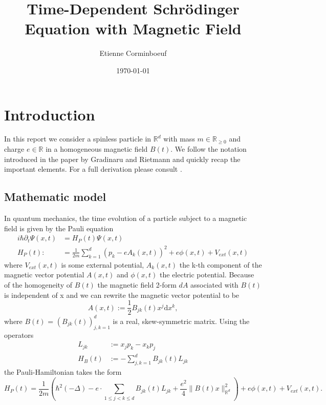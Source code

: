 \documentclass{article}
\title{Time-Dependent Schr{\"o}dinger Equation with Magnetic Field}
\author{Etienne Corminboeuf}
\date{\today}
\begin{document}
\maketitle

\tableofcontents

\section{Introduction} \label{sec:intro}
In this report we consider a spinless particle in $\mathbb{R}^d$ with mass $m \in \mathbb{R}_{\geq 0}$ and charge $e\in \mathbb{R}$ in a homogeneous magnetic field $B(t)$. We follow the notation introduced in the paper by Gradinaru and Rietmann and quickly recap the important elements. For a full derivation please consult \cite{paper_orvg}.
\subsection{Mathematic model}

In quantum mechanics, the time evolution of a particle subject to a magnetic field is given by the Pauli equation
\begin{align} \label{eq_pauli}
  i \hbar \partial_t \Psi(x,t) &= H_P(t)\Psi(x,t) \\
  H_P(t) :&= \frac{1}{2m} \sum_{k=1}^d (p_k - e A_k(x,t))^2 + e\phi(x,t) + V_{ext}(x,t)
\end{align}
where $V_{ext}(x,t)$ is some external potential, $A_k(x,t)$ the k-th component of the magnetic vector potential $A(x,t)$ and $\phi(x,t)$ the electric potential.
Because of the homogeneity of $B(t)$ the magnetic field 2-form $dA$ associated with $B(t)$ is independent of x and we can rewrite the magnetic vector potential to be
\begin{equation}
  A(x,t) := \frac{1}{2}B_{jk}(t)x^j \textrm{d}x^k,
\end{equation}
where $B(t)$ = $(B_{jk}(t))_{j,k = 1}^d$ is a real, skew-symmetric matrix. Using the operators
\begin{align}
  L_{jk} & := x_j p_k - x_k p_j \\
  H_B(t) & := - \sum_{j,k = 1}^d B_{jk}(t) L_{jk}
\end{align}
the Pauli-Hamiltonian takes the form
\begin{equation}
  H_P(t) = \frac{1}{2 m} \left(\hbar^{2}(-\Delta)-e \cdot \sum_{1 \leqslant j<k \leqslant d} B_{j k}(t) L_{j k} +\frac{e^{2}}{4}\|B(t) x\|_{\mathbb{R}^{d}}^{2}  \right) + e \phi(x,t) + V_{ext}(x,t).
\end{equation}
\end{document}
